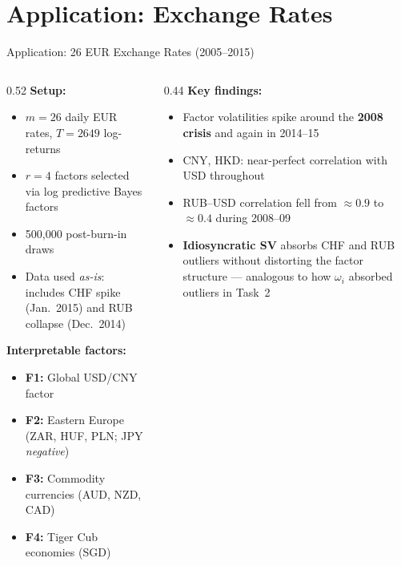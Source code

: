 \documentclass[10pt]{beamer}\usepackage[]{graphicx}\usepackage[table]{xcolor}
\begin{document}

\section{Application: Exchange Rates}

\begin{frame}{Application: 26 EUR Exchange Rates (2005--2015)}

  \begin{columns}[T]
    \begin{column}{0.52\textwidth}
      \textbf{Setup:}
      \begin{itemize}
        \setlength\itemsep{0.35em}
        \item $m=26$ daily EUR rates, $T=2649$ log-returns
        \item $r=4$ factors selected via log predictive Bayes factors
        \item 500{,}000 post-burn-in draws
        \item Data used \emph{as-is}: includes CHF spike (Jan.\ 2015)
              and RUB collapse (Dec.\ 2014)
      \end{itemize}

      \vspace{0.1em}
      \textbf{Interpretable factors:}
      \begin{itemize}
        \setlength\itemsep{0.3em}
        \item \textbf{F1:} Global USD/CNY factor
        \item \textbf{F2:} Eastern Europe
              (ZAR, HUF, PLN; JPY \emph{negative})
        \item \textbf{F3:} Commodity currencies (AUD, NZD, CAD)
        \item \textbf{F4:} Tiger Cub economies (SGD)
      \end{itemize}
    \end{column}
    \begin{column}{0.44\textwidth}
      \textbf{Key findings:}
      \begin{itemize}
        \setlength\itemsep{0.4em}
        \item Factor volatilities spike around the
              \textbf{2008 crisis} and again in 2014--15
        \item CNY, HKD: near-perfect correlation with USD throughout
        \item RUB--USD correlation fell from $\approx 0.9$ to
              $\approx 0.4$ during 2008--09
        \item \textbf{Idiosyncratic SV} absorbs CHF and RUB outliers
              without distorting the factor structure ---
              analogous to how $\omega_i$ absorbed outliers in Task~2
      \end{itemize}
    \end{column}
  \end{columns}

\end{frame}
\end{document}
